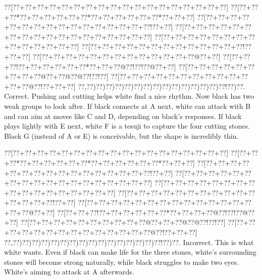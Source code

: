\documentclass[a5paper]{article}
\begin{document}
\begin{center}
{\goo
\0??[\0??+\0??+\0??+\0??+\0??+\0??+\0??+\0??+\0??+\0??+\0??+\0??+\0??+\0??+\0??+\0??+\0??+\0??]
\0??[\0??+\0??+\0??*\0??+\0??+\0??+\0??+\0??+\0??*\0??+\0??+\0??+\0??+\0??+\0??*\0??+\0??+\0??]
\0??[\0??+\0??+\0??+\0??+\0??+\0??+\0??+\0??+\0??+\0??+\0??+\0??+\0??+\0??+\0??+\0??!\0??+\0??]
\0??[\0??+\0??+\0??+\0??+\0??+\0??+\0??+\0??+\0??+\0??+\0??+\0??+\0??+\0??+\0??+\0??+\0??+\0??]
\0??[\0??+\0??+\0??+\0??+\0??+\0??+\0??+\0??+\0??+\0??+\0??+\0??+\0??+\0??]
\0??[\0??+\0??+\0??+\0??+\0??+\0??+\0??+\0??+\0??+\0??+\0??+\0??+\0??!\0??+\0??+\0??]
\0??[\0??+\0??+\0??+\0??+\0??+\0??+\0??+\0??+\0??+\0??+\0??+\0??+\0??@\0??+\0??]
\0??[\0??+\0??+\0??!\0??+\0??+\0??+\0??+\0??+\0??*\0??+\0??+\0??@\0??!\0??!\0??@\0??+\0??]
\0??[\0??+\0??+\0??+\0??+\0??+\0??+\0??+\0??+\0??@\0??+\0??@\0??@\0??!\0??!\0??]
\0??[\0??+\0??+\0??+\0??+\0??+\0??+\0??+\0??+\0??+\0??+\0??+\0??+\0??@\0??!\0??+\0??+\0??]
\0??,\0??)\0??)\0??)\0??)\0??)\0??)\0??)\0??)\0??)\0??)\0??)\0??)\0??)\0??)\0??!\0??)\0??.
}
Correct. Pushing and cutting helps white find a nice rhythm. Now black has two weak groups to look after. If black connects at A next, white can attack with B and can aim at moves like C and D, depending on black's responses. If black plays lightly with E next, white F is a tesuji to capture the four cutting stones. Black G (instead of A or E) is conceivable, but the shape is incredibly thin.

\end{center}
\begin{center}
{\goo
\0??[\0??+\0??+\0??+\0??+\0??+\0??+\0??+\0??+\0??+\0??+\0??+\0??+\0??+\0??+\0??+\0??+\0??+\0??]
\0??[\0??+\0??+\0??*\0??+\0??+\0??+\0??+\0??+\0??*\0??+\0??+\0??+\0??+\0??+\0??*\0??+\0??+\0??]
\0??[\0??+\0??+\0??+\0??+\0??+\0??+\0??+\0??+\0??+\0??+\0??+\0??+\0??+\0??+\0??+\0??!\0??+\0??]
\0??[\0??+\0??+\0??+\0??+\0??+\0??+\0??+\0??+\0??+\0??+\0??+\0??+\0??+\0??+\0??+\0??+\0??+\0??]
\0??[\0??+\0??+\0??+\0??+\0??+\0??+\0??+\0??+\0??+\0??+\0??+\0??+\0??+\0??+\0??+\0??+\0??]
\0??[\0??+\0??+\0??+\0??+\0??+\0??+\0??+\0??+\0??+\0??+\0??+\0??+\0??+\0??+\0??!\0??+\0??]
\0??[\0??+\0??+\0??+\0??+\0??+\0??+\0??+\0??+\0??+\0??+\0??+\0??+\0??+\0??+\0??+\0??@\0??+\0??]
\0??[\0??+\0??+\0??!\0??+\0??+\0??+\0??+\0??+\0??*\0??+\0??+\0??+\0??@\0??!\0??!\0??@\0??+\0??]
\0??[\0??+\0??+\0??+\0??+\0??+\0??+\0??+\0??+\0??+\0??@\0??+\0??+\0??@\0??@\0??!\0??!\0??]
\0??[\0??+\0??+\0??+\0??+\0??+\0??+\0??+\0??+\0??+\0??+\0??+\0??+\0??+\0??@\0??!\0??+\0??+\0??]
\0??,\0??)\0??)\0??)\0??)\0??)\0??)\0??)\0??)\0??)\0??)\0??)\0??)\0??)\0??)\0??)\0??!\0??)\0??.
}
Incorrect. This is what white wants. Even if black can make life for the three stones, white's surrounding stones will become strong naturally, while black struggles to make two eyes. White's aiming to attack at A afterwards.

\end{center}
\end{document}
